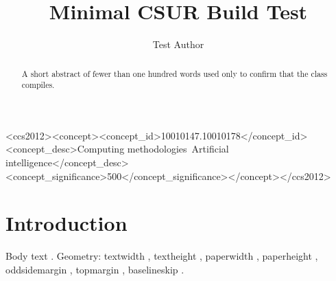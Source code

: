 \documentclass[manuscript,review]{acmart}
\begin{document}
\title{Minimal CSUR Build Test}
\author{Test Author}
\begin{abstract}
A short abstract of fewer than one hundred words used only to confirm that the class compiles.
\end{abstract}
\begin{CCSXML}
<ccs2012><concept><concept_id>10010147.10010178</concept_id><concept_desc>Computing methodologies~Artificial intelligence</concept_desc><concept_significance>500</concept_significance></concept></ccs2012>
\end{CCSXML}
\maketitle
\section{Introduction}
Body text \cite{knuth84}. Geometry: textwidth \the\textwidth, textheight \the\textheight, paperwidth \the\paperwidth, paperheight \the\paperheight, oddsidemargin \the\oddsidemargin, topmargin \the\topmargin, baselineskip \the\baselineskip.


\end{document}
